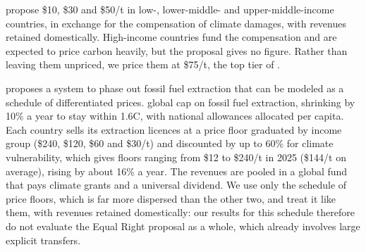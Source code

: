 \documentclass[12pt,english]{article}
\theoremstyle{remark}
\begin{document}
\citet{banerjee_grand_2025} propose \$10, \$30 and \$50/t in low-, lower-middle- and upper-middle-income countries, in exchange for the compensation of climate damages, with revenues retained domestically. High-income countries fund the compensation and are expected to price carbon heavily, but the proposal gives no figure. Rather than leaving them unpriced, we price them at \$75/t, the top tier of \citet{wolfram_building_2025}.

\citet{equal_right_climate_2023} proposes a system to phase out fossil fuel extraction that can be modeled as a schedule of differentiated prices.  global cap on fossil fuel extraction, shrinking by 10\% a year to stay within 1.6\textdegree C, with national allowances allocated per capita. Each country sells its extraction licences at a price floor graduated by income group (\$240, \$120, \$60 and \$30/t) and discounted by up to 60\% for climate vulnerability, which gives floors ranging from \$12 to \$240/t in 2025 (\$144/t on average), rising by about 16\% a year. 
The revenues are pooled in a global fund that pays climate grants and a universal dividend. We use only the schedule of price floors, which is far more dispersed than the other two, and treat it like them, with revenues retained domestically: our results for this schedule therefore do not evaluate the Equal Right proposal as a whole, which already involves large explicit transfers. %
\end{document}
